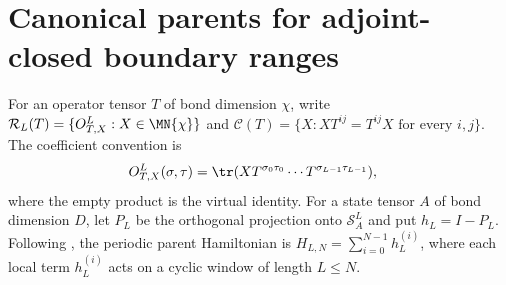 
\section{Canonical parents for adjoint-closed boundary ranges}
\label{sec:glm_boundary_parent}

For an operator tensor $T$ of bond dimension $\chi$, write
$\mathcal R_L(T)=\{O^L_{T,X}:X\in\MN{\chi}\}$ and
$\mathcal C(T)=\{X:XT^{ij}=T^{ij}X\text{ for every }i,j\}$.
The coefficient convention is
\begin{align}
    O^L_{T,X}(\sigma,\tau)
     & =\tr(XT^{\sigma_0\tau_0}\cdots T^{\sigma_{L-1}\tau_{L-1}}),
    \notag
\end{align}
where the empty product is the virtual identity.
For a state tensor $A$ of bond dimension $D$, let $P_L$ be the
orthogonal projection onto $\mathcal S_A^L$ and put $h_L=I-P_L$.
Following \cite[Section~5 and Appendix~B]{GarreRubio2023MPOSym}, the
periodic parent Hamiltonian is $H_{L,N}=\sum_{i=0}^{N-1}h_L^{(i)}$, where
each local term $h_L^{(i)}$ acts on a cyclic window of length $L\leq N$.

